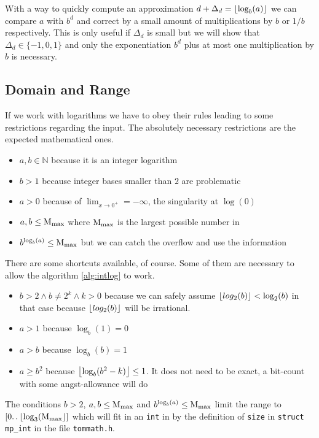 With a way to quickly compute an approximation $d + \Delta_d = \left\lfloor\log_b(a)\right\rfloor$ we can
compare $a$ with $b^d$ and correct by a small amount of multiplications by $b$ or $1/b$
respectively. This is only useful if $\Delta_d$ is small but
we will show that $\Delta_d \in \{-1, 0, 1\}$ and only the exponentiation $b^d$ plus at most
one multiplication by $b$ is necessary.

\subsection{Domain and Range}
If we work with logarithms we have to obey their rules leading to some restrictions
regarding the input.
The absolutely necessary restrictions are the expected mathematical ones.
\begin{itemize}
\item{$a,b\in\mathbb{N}$ because it is an integer logarithm}
\item{$b > 1$ because integer bases smaller than $2$ are problematic}
\item{$a > 0$ because of $\lim_{x\to 0^+} = -\infty$, the singularity at $\log(0)$}
\item{$a,b \le \textrm{M}_{\textrm{max}}$ where $\textrm{M}_{\textrm{max}}$ is the largest possible
      number in \libtommath}
\item{$b^{\log_b(a)} \le \textrm{M}_{\textrm{max}}$ but we can catch the overflow and use the information}
\end{itemize}
There are some shortcuts available, of course. Some of them are necessary to allow the
algorithm \ref{alg:intlog} to work.
\begin{itemize}
\item{$b > 2 \wedge b \not= 2^k \wedge k > 0$ because we can safely assume
              $\left\lfloor log_2(b)\right\rfloor < \log_2(b)$ in that case because $\left\lfloor log_2(b)\right\rfloor$
              will be irrational.}
\item{$a > 1$ because $\log_b(1) = 0$}
\item{$a > b$ because $\log_b(b) = 1$}
\item{$a \ge b^2$ because $\left\lfloor\log_b(b^2 - k)\right\rfloor \le 1$. It does not need to be exact,
                a bit-count with some angst-allowance will do}
\end{itemize}
The conditions $b>2$, $a,b \le \textrm{M}_{\textrm{max}}$ and $b^{\log_b(a)} \le \textrm{M}_{\textrm{max}}$ limit
the range to $[0\ldotp \ldotp \left\lfloor\log_3(\textrm{M}_{\textrm{max}}\right\rfloor]$ which will fit in an \texttt{int}
in \libtommath{} by the definition of \texttt{size} in \texttt{struct mp\_int} in the file
\texttt{tommath.h}.

